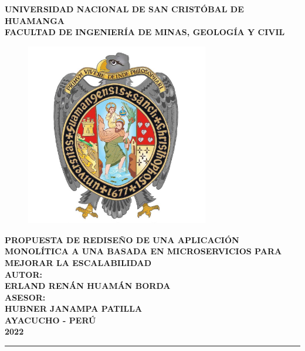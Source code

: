 \begin{titlepage}

\centering
  { \fontsize{18pt}{\baselineskip}\selectfont \textbf{UNIVERSIDAD NACIONAL DE SAN CRISTÓBAL DE HUAMANGA} }\\[0.25cm]
  { \fontsize{16pt}{\baselineskip}\selectfont \textbf{FACULTAD DE INGENIERÍA DE MINAS, GEOLOGÍA Y CIVIL} }\\[0.25cm]

  \begin{figure}[htb]
    \centering
    \includegraphics[height=8cm]{src/assets/unsch_logo.jpg}
  \end{figure}

\vspace{0.5cm}
{\fontsize{14pt}{ \baselineskip}\selectfont \textbf{PROPUESTA DE REDISEÑO DE UNA APLICACIÓN MONOLÍTICA A UNA BASADA EN MICROSERVICIOS PARA MEJORAR LA ESCALABILIDAD}}\\[0.5cm]
{\fontsize{14pt}{ \baselineskip}\selectfont \textbf{AUTOR:}}\\[0.5cm]
{\fontsize{14pt}{ \baselineskip}\selectfont \textbf{ERLAND RENÁN HUAMÁN BORDA}}\\[0.5cm]
{\fontsize{14pt}{ \baselineskip}\selectfont \textbf{ASESOR:}}\\[0.5cm]
{\fontsize{14pt}{ \baselineskip}\selectfont \textbf{HUBNER JANAMPA PATILLA}}\\[0.5cm]

\vfill
{\fontsize{14pt}{ \baselineskip}\selectfont \textbf{AYACUCHO - PERÚ}}\\[0.5cm]
{\fontsize{14pt}{ \baselineskip}\selectfont \textbf{2022}}
\singlespacing
\rule{132mm}{0.25mm}\\

\end{titlepage}
\restoregeometry
\newpage

